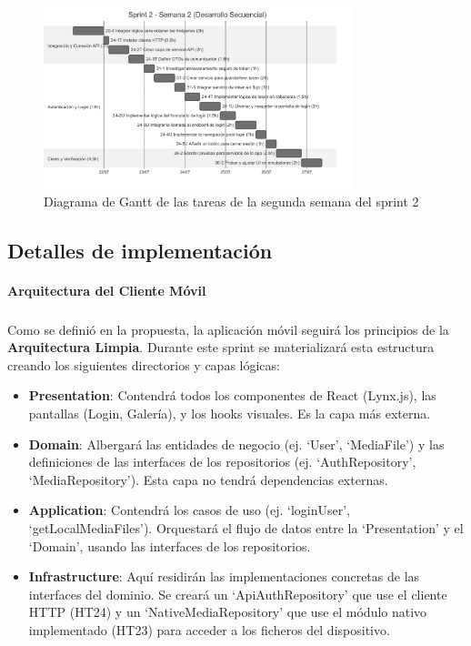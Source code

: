 \begin{figure}[H]
    \begin{center}
        \includegraphics[width=0.8\textwidth]{assets/sprint2/week2-gantt.png}
    \end{center}
    \caption{Diagrama de Gantt de las tareas de la segunda semana del sprint 2}\label{fig:gantt-sprint2-week2}
\end{figure}


\subsection{Detalles de implementación}

\paragraph{Arquitectura del Cliente Móvil}
\subparagraph{}
Como se definió en la propuesta, la aplicación móvil seguirá los principios de la \textbf{Arquitectura Limpia}. Durante este sprint se materializará esta estructura creando los siguientes directorios y capas lógicas:
\begin{itemize}
    \item \textbf{Presentation}: Contendrá todos los componentes de React (Lynx.js), las pantallas (Login, Galería), y los hooks visuales. Es la capa más externa.
    \item \textbf{Domain}: Albergará las entidades de negocio (ej. `User', `MediaFile') y las definiciones de las interfaces de los repositorios (ej. `AuthRepository', `MediaRepository'). Esta capa no tendrá dependencias externas.
    \item \textbf{Application}: Contendrá los casos de uso (ej. `loginUser', `getLocalMediaFiles'). Orquestará el flujo de datos entre la `Presentation' y el `Domain', usando las interfaces de los repositorios.
    \item \textbf{Infrastructure}: Aquí residirán las implementaciones concretas de las interfaces del dominio. Se creará un `ApiAuthRepository' que use el cliente HTTP (HT24) y un `NativeMediaRepository' que use el módulo nativo implementado (HT23) para acceder a los ficheros del dispositivo.
\end{itemize}


